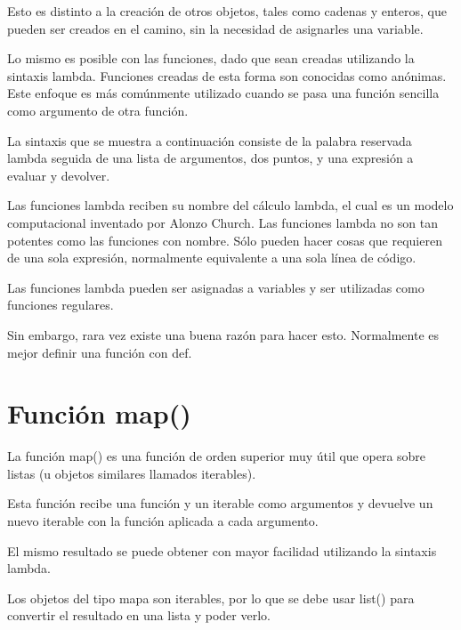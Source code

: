 \documentclass{report}
\begin{document}
{Esto es distinto a la creación de otros objetos, tales como cadenas y enteros, que pueden ser creados en el camino, sin la necesidad de asignarles una variable.

Lo mismo es posible con las funciones, dado que sean creadas utilizando la sintaxis lambda. Funciones creadas de esta forma son conocidas como anónimas.
Este enfoque es más comúnmente utilizado cuando se pasa una función sencilla como argumento de otra función.

La sintaxis que se muestra a continuación consiste de la palabra reservada lambda seguida de una lista de argumentos, dos puntos, y una expresión a evaluar y devolver.


Las funciones lambda reciben su nombre del cálculo lambda, el cual es un modelo computacional inventado por Alonzo Church.
Las funciones lambda no son tan potentes como las funciones con nombre. Sólo pueden hacer cosas que requieren de una sola expresión, normalmente equivalente a una sola línea de código.



Las funciones lambda pueden ser asignadas a variables y ser utilizadas como funciones regulares.


Sin embargo, rara vez existe una buena razón para hacer esto. Normalmente es mejor definir una función con def.

\section{Función map()}

La función map() es una función de orden superior muy útil que opera sobre listas (u objetos similares llamados iterables).

Esta función recibe una función y un iterable como argumentos y devuelve un nuevo iterable con la función aplicada a cada argumento.


El mismo resultado se puede obtener con mayor facilidad utilizando la sintaxis lambda.


Los objetos del tipo mapa son iterables, por lo que se debe usar list() para convertir el resultado en una lista y poder verlo.

}
\end{document}
